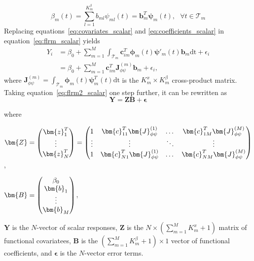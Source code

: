 \begin{equation}\label{eq:coefficients_scalar}
\beta_{m}(t) = \sum_{l=1}^{K_m^{\beta}} b_{m l}\psi_{m l}(t) = \bm{b}_{m}^T \bm{\psi}_m(t),\text{ } \forall t \in \mathcal{T}_m
\end{equation}
Replacing equations~\eqref{eq:covariates_scalar} and \eqref{eq:coefficients_scalar} in equation~\eqref{eq:flrm_scalar} yields
\begin{align}\label{eq:flrm2_scalar}
Y_{i} &= \beta_{0} + \sum_{m=1}^{M} \int_{\mathcal{T}_m} \bm{c}_{i m}^T \bm{\phi}_{m}(t)\bm{\psi}'_m(t)\bm{b}_{m}\mathrm{dt} + \epsilon_{i} \nonumber \\
&= \beta_{0} + \sum_{m=1}^{M} \bm{c}_{i m}^T \bm{J}_{\phi \psi}^{(m)}\bm{b}_{m} + \epsilon_{i},
\end{align}
where $\bm{J}_{\phi \psi}^{(m)} = \int_{\mathcal{T}_m} \bm{\phi}_{m}(t)\bm{\psi}^T_m(t)\mathrm{dt}$ is the $K_m^{x} \times K_m^{\beta}$ cross-product matrix. Taking equation~\eqref{eq:flrm2_scalar} one step further, it can be rewritten as
\begin{equation}
\bm{Y} = \bm{Z}\bm{B} + \bm{\epsilon} 
\end{equation}

where
\begin{center}
$ \bm{Z}=\def\arraystretch{1} \begin{pmatrix}
\bm{z}^T_1 \\
\vdots\\
\bm{z}^T_N
\end{pmatrix} = \def\arraystretch{1}
\begin{pmatrix}
1 & \bm{c}_{1 1}^T \bm{J}_{\phi \psi}^{(1)} & \dots & \bm{c}_{1 M}^T \bm{J}_{\phi \psi}^{(M)} \\
\vdots & \vdots & \ddots & \vdots \\
1 & \bm{c}_{N 1}^T \bm{J}_{\phi \psi}^{(1)} & \dots & \bm{c}_{N M}^T \bm{J}_{\phi \psi}^{(M)}  
\end{pmatrix}$,
\end{center}

\begin{center}
$ \bm{B} =\def\arraystretch{1} \begin{pmatrix}
\beta_{0} \\
\bm{b}_1\\
\vdots\\
\bm{b}_{M}
\end{pmatrix}$,
\end{center}
$\bm{Y}$ is the $N$-vector of scalar responses, $\bm{Z}$ is the $N \times \left(\sum_{m=1}^{M} K_m^{x} +1 \right)$ matrix of functional covariatees, $\bm{B}$ is the $\left(\sum_{m=1}^{M} K_m^{\beta} +1 \right) \times 1$ vector of functional coefficients, and $\bm{\epsilon}$ is the $N$-vector error terms.

